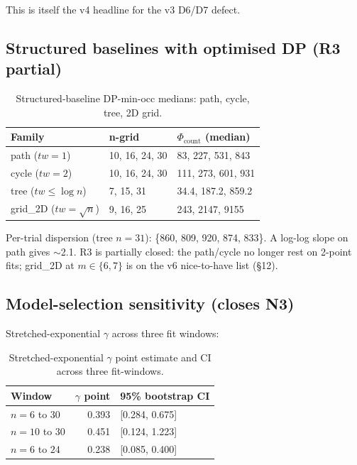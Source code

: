 \documentclass[11pt,a4paper]{article}
\theoremstyle{remark}
\begin{document}
This is itself the v4 headline for the v3 D6/D7 defect.

\subsection{Structured baselines with optimised DP (R3 partial)}

\begin{table}[H]
\centering
\small
\begin{tabular}{@{}lll@{}}
\toprule
Family & n-grid & $\Phi_{\mathrm{count}}$ (median) \\
\midrule
path ($tw = 1$) & 10, 16, 24, 30 & 83, 227, 531, 843 \\
cycle ($tw = 2$) & 10, 16, 24, 30 & 111, 273, 601, 931 \\
tree ($tw \le \log n$) & 7, 15, 31 & 34.4, 187.2, 859.2 \\
grid\_2D ($tw = \sqrt{n}$) & 9, 16, 25 & 243, 2147, 9155 \\
\bottomrule
\end{tabular}
\caption{Structured-baseline DP-min-occ medians: path, cycle, tree, 2D grid.}
\label{tab:structured}
\end{table}

Per-trial dispersion (tree $n=31$): \{860, 809, 920, 874, 833\}. A log-log
slope on path gives $\sim$2.1. R3 is partially closed: the path/cycle no
longer rest on 2-point fits; grid\_2D at $m \in \{6, 7\}$ is on the v6
nice-to-have list (\S12).

\subsection{Model-selection sensitivity (closes N3)}

Stretched-exponential $\gamma$ across three fit windows:

\begin{table}[H]
\centering
\small
\begin{tabular}{@{}lrl@{}}
\toprule
Window & $\gamma$ point & 95\% bootstrap CI \\
\midrule
$n = 6$ to $30$ & 0.393 & [0.284, 0.675] \\
$n = 10$ to $30$ & 0.451 & [0.124, 1.223] \\
$n = 6$ to $24$ & 0.238 & [0.085, 0.400] \\
\bottomrule
\end{tabular}
\caption{Stretched-exponential $\gamma$ point estimate and CI across three fit-windows.}
\label{tab:gamma-windows}
\end{table}
\end{document}
